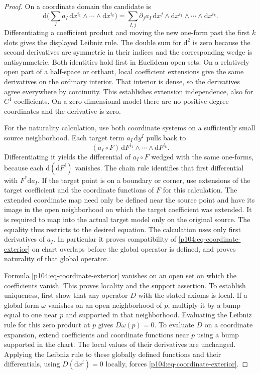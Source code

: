 \documentclass[11pt,oneside,openany]{book}
\theoremstyle{definition}
\theoremstyle{remark}
\newcommand{\dd}{\mathrm d}
\begin{document}
\begin{proof}
On a coordinate domain the candidate is
\begin{equation}\label{p104:eq-coordinate-exterior}
 \dd\Big(\sum_I a_I\,\dd x^{i_1}\wedge\cdots\wedge\dd x^{i_k}\Big)
 =\sum_{I,j}\partial_j a_I\,\dd x^j\wedge\dd x^{i_1}\wedge\cdots\wedge\dd x^{i_k}.
\end{equation}
Differentiating a coefficient product and moving the new one-form past the first \(k\) slots gives the displayed Leibniz rule. The double sum for \(\dd^2\) is zero because the second derivatives are symmetric in their indices and the corresponding wedge is antisymmetric. Both identities hold first in Euclidean open sets. On a relatively open part of a half-space or orthant, local coefficient extensions give the same derivatives on the ordinary interior. That interior is dense, so the derivatives agree everywhere by continuity. This establishes extension independence, also for \(C^1\) coefficients. On a zero-dimensional model there are no positive-degree coordinates and the derivative is zero.

For the naturality calculation, use both coordinate systems on a sufficiently small source neighborhood. Each target term \(a_I\,\dd y^I\) pulls back to
\[
 (a_I\circ F)\,\dd F^{i_1}\wedge\cdots\wedge\dd F^{i_k}.
\]
Differentiating it yields the differential of \(a_I\circ F\) wedged with the same one-forms, because each \(\dd(\dd F^i)\) vanishes. The chain rule identifies that first differential with \(F^*\dd a_I\). If the target point is on a boundary or corner, use extensions of the target coefficient and the coordinate functions of \(F\) for this calculation. The extended coordinate map need only be defined near the source point and have its image in the open neighborhood on which the target coefficient was extended. It is required to map into the actual target model only on the original source. The equality thus restricts to the desired equation. The calculation uses only first derivatives of \(a_I\). In particular it proves compatibility of \eqref{p104:eq-coordinate-exterior} on chart overlaps before the global operator is defined, and proves naturality of that global operator.

Formula \eqref{p104:eq-coordinate-exterior} vanishes on an open set on which the coefficients vanish. This proves locality and the support assertion. To establish uniqueness, first show that any operator \(D\) with the stated axioms is local. If a global form \(\omega\) vanishes on an open neighborhood of \(p\), multiply it by a bump equal to one near \(p\) and supported in that neighborhood. Evaluating the Leibniz rule for this zero product at \(p\) gives \(D\omega(p)=0\). To evaluate \(D\) on a coordinate expansion, extend coefficients and coordinate functions near \(p\) using a bump supported in the chart. The local values of their derivatives are unchanged. Applying the Leibniz rule to these globally defined functions and their differentials, using \(D(\dd x^i)=0\) locally, forces \eqref{p104:eq-coordinate-exterior}.
\end{proof}
\end{document}
